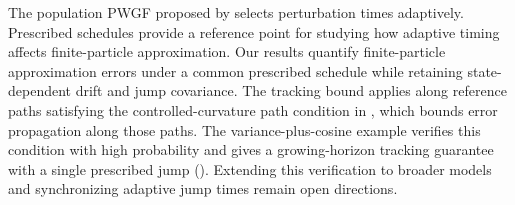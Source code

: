 The population PWGF proposed by \citet{yamamoto2025hessianguided}
selects perturbation times adaptively.
Prescribed schedules provide a reference point for studying how adaptive
timing affects finite-particle approximation.
Our results quantify finite-particle approximation errors under a common
prescribed schedule while retaining state-dependent drift and jump covariance.
The tracking bound applies along reference paths satisfying
the controlled-curvature path condition in ,
which bounds error propagation along those paths.
The variance-plus-cosine example verifies this condition with high probability
and gives a growing-horizon tracking guarantee with a single prescribed
jump ().
Extending this verification to broader models and synchronizing adaptive
jump times remain open directions.
